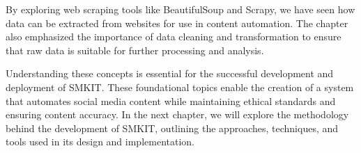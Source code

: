 By exploring web scraping tools like BeautifulSoup and Scrapy, we have seen how data can be extracted from websites for use in content automation. The chapter also emphasized the importance of data cleaning and transformation to ensure that raw data is suitable for further processing and analysis.

Understanding these concepts is essential for the successful development and deployment of SMKIT. These foundational topics enable the creation of a system that automates social media content while maintaining ethical standards and ensuring content accuracy. In the next chapter, we will explore the methodology behind the development of SMKIT, outlining the approaches, techniques, and tools used in its design and implementation.

